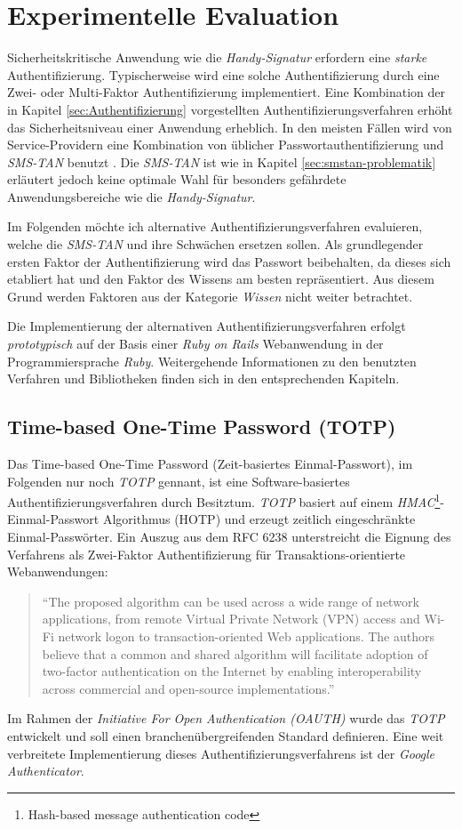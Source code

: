 \documentclass[11pt,a4paper,ngerman]{scrreprt}
\begin{document}
\chapter{Experimentelle Evaluation}
Sicherheitskritische Anwendung wie die \textit{Handy-Signatur} erfordern eine \emph{starke} Authentifizierung. Typischerweise wird eine solche Authentifizierung durch eine Zwei- oder Multi-Faktor Authentifizierung implementiert. Eine Kombination der in Kapitel \ref{sec:Authentifizierung} vorgestellten Authentifizierungsverfahren erhöht das Sicherheitsniveau einer Anwendung erheblich. In den meisten Fällen wird von Service-Providern eine Kombination von üblicher Passwortauthentifizierung und \textit{SMS-TAN} benutzt \cite{fido17}. Die \textit{SMS-TAN} ist wie in Kapitel \ref{sec:smstan-problematik} erläutert jedoch keine optimale Wahl für besonders gefährdete Anwendungsbereiche wie die \textit{Handy-Signatur}.

Im Folgenden möchte ich alternative Authentifizierungsverfahren evaluieren, welche die \textit{SMS-TAN} und ihre Schwächen ersetzen sollen. Als grundlegender ersten Faktor der Authentifizierung wird das Passwort beibehalten, da dieses sich etabliert hat und den Faktor des Wissens am besten repräsentiert. Aus diesem Grund werden Faktoren aus der Kategorie \emph{Wissen} nicht weiter betrachtet.

Die Implementierung der alternativen Authentifizierungsverfahren erfolgt \emph{prototypisch} auf der Basis einer \textit{Ruby on Rails} Webanwendung in der Programmiersprache \textit{Ruby}. Weitergehende Informationen zu den benutzten Verfahren und Bibliotheken finden sich in den entsprechenden Kapiteln.

\section{Time-based One-Time Password (TOTP)}\label{sec:TOTP}
Das Time-based One-Time Password (Zeit-basiertes Einmal-Passwort), im Folgenden nur noch \textit{TOTP} gennant, ist eine Software-basiertes Authentifizierungsverfahren durch Besitztum. \textit{TOTP} basiert auf einem \textit{HMAC}\footnote{Hash-based message authentication code}-Einmal-Passwort Algorithmus (HOTP) und erzeugt zeitlich eingeschränkte Einmal-Passwörter. Ein Auszug aus dem RFC 6238 unterstreicht die Eignung des Verfahrens als Zwei-Faktor Authentifizierung für Transaktions-orientierte Webanwendungen:
\begin{quote}
    ``The proposed algorithm can be used across a wide range of network
    applications, from remote Virtual Private Network (VPN) access and
    Wi-Fi network logon to transaction-oriented Web applications.  The
    authors believe that a common and shared algorithm will facilitate
    adoption of two-factor authentication on the Internet by enabling
    interoperability across commercial and open-source implementations.'' \cite{rfc6238}
\end{quote}
Im Rahmen der \textit{Initiative For Open Authentication (OAUTH)} wurde das \textit{TOTP} entwickelt und soll einen branchenübergreifenden Standard definieren. Eine weit verbreitete Implementierung dieses Authentifizierungsverfahrens ist der \textit{Google Authenticator}.
\end{document}
